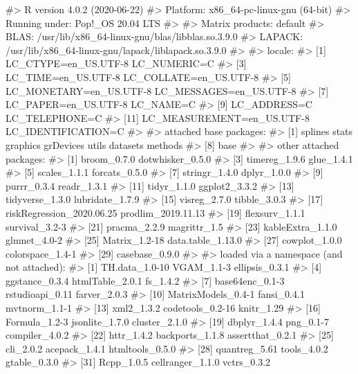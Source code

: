\documentclass[
]{jss}
\begin{document}
\begin{CodeChunk}

\begin{CodeOutput}
#> R version 4.0.2 (2020-06-22)
#> Platform: x86_64-pc-linux-gnu (64-bit)
#> Running under: Pop!_OS 20.04 LTS
#> 
#> Matrix products: default
#> BLAS:   /usr/lib/x86_64-linux-gnu/blas/libblas.so.3.9.0
#> LAPACK: /usr/lib/x86_64-linux-gnu/lapack/liblapack.so.3.9.0
#> 
#> locale:
#>  [1] LC_CTYPE=en_US.UTF-8       LC_NUMERIC=C              
#>  [3] LC_TIME=en_US.UTF-8        LC_COLLATE=en_US.UTF-8    
#>  [5] LC_MONETARY=en_US.UTF-8    LC_MESSAGES=en_US.UTF-8   
#>  [7] LC_PAPER=en_US.UTF-8       LC_NAME=C                 
#>  [9] LC_ADDRESS=C               LC_TELEPHONE=C            
#> [11] LC_MEASUREMENT=en_US.UTF-8 LC_IDENTIFICATION=C       
#> 
#> attached base packages:
#> [1] splines   stats     graphics  grDevices utils     datasets  methods  
#> [8] base     
#> 
#> other attached packages:
#>  [1] broom_0.7.0               dotwhisker_0.5.0         
#>  [3] timereg_1.9.6             glue_1.4.1               
#>  [5] scales_1.1.1              forcats_0.5.0            
#>  [7] stringr_1.4.0             dplyr_1.0.0              
#>  [9] purrr_0.3.4               readr_1.3.1              
#> [11] tidyr_1.1.0               ggplot2_3.3.2            
#> [13] tidyverse_1.3.0           lubridate_1.7.9          
#> [15] visreg_2.7.0              tibble_3.0.3             
#> [17] riskRegression_2020.06.25 prodlim_2019.11.13       
#> [19] flexsurv_1.1.1            survival_3.2-3           
#> [21] pracma_2.2.9              magrittr_1.5             
#> [23] kableExtra_1.1.0          glmnet_4.0-2             
#> [25] Matrix_1.2-18             data.table_1.13.0        
#> [27] cowplot_1.0.0             colorspace_1.4-1         
#> [29] casebase_0.9.0           
#> 
#> loaded via a namespace (and not attached):
#>  [1] TH.data_1.0-10      VGAM_1.1-3          ellipsis_0.3.1     
#>  [4] ggstance_0.3.4      htmlTable_2.0.1     fs_1.4.2           
#>  [7] base64enc_0.1-3     rstudioapi_0.11     farver_2.0.3       
#> [10] MatrixModels_0.4-1  fansi_0.4.1         mvtnorm_1.1-1      
#> [13] xml2_1.3.2          codetools_0.2-16    knitr_1.29         
#> [16] Formula_1.2-3       jsonlite_1.7.0      cluster_2.1.0      
#> [19] dbplyr_1.4.4        png_0.1-7           compiler_4.0.2     
#> [22] httr_1.4.2          backports_1.1.8     assertthat_0.2.1   
#> [25] cli_2.0.2           acepack_1.4.1       htmltools_0.5.0    
#> [28] quantreg_5.61       tools_4.0.2         gtable_0.3.0       
#> [31] Rcpp_1.0.5          cellranger_1.1.0    vctrs_0.3.2        

\end{CodeOutput}
\end{CodeChunk}
\end{document}
